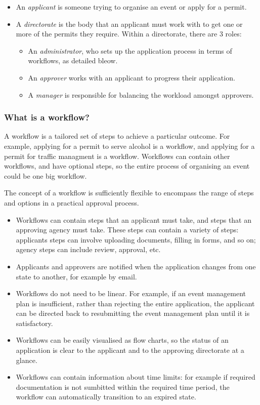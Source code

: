 \documentclass[12pt]{article}
\begin{document}
\begin{itemize}
\itemsep1pt\parskip0pt
\item
  An \emph{applicant} is someone trying to organise an event or apply
  for a permit.
\item
  A \emph{directorate} is the body that an applicant must work with to
  get one or more of the permits they require. Within a directorate,
  there are 3 roles:

  \begin{itemize}
  \item
    An \emph{administrator}, who sets up the application process in
    terms of workflows, as detailed bleow.
  \item
    An \emph{approver} works with an applicant to progress their
    application.
  \item
    A \emph{manager} is responsible for balancing the workload amongst
    approvers.
  \end{itemize}
\end{itemize}

\subsubsection{What is a workflow?}

A workflow is a tailored set of steps to achieve a particular outcome.
For example, applying for a permit to serve alcohol is a workflow, and
applying for a permit for traffic managment is a workflow. Workflows can
contain other workflows, and have optional steps, so the entire process
of organising an event could be one big workflow.

The concept of a workflow is sufficiently flexible to encompass the
range of steps and options in a practical approval process. 
\begin{itemize}
\item Workflows can contain steps that an applicant must take, and
  steps that an approving agency must take. These steps can contain a
  variety of steps: applicants steps can involve uploading documents,
  filling in forms, and so on; agency steps can include review,
  approval, etc.
\item Applicants and approvers are notified when the application
  changes from one state to another, for example by email.
\item Workflows do not need to be linear. For example, if an event
  management plan is insufficient, rather than rejecting the entire
  application, the applicant can be directed back to resubmitting the
  event management plan until it is satisfactory.
\item Workflows can be easily visualised as flow charts, so the status
  of an application is clear to the applicant and to the approving
  directorate at a glance.
\item Workflows can contain information about time limits: for example
  if required documentation is not sumbitted within the required time
  period, the workflow can automatically transition to an expired
  state.
\end{itemize}
\end{document}
